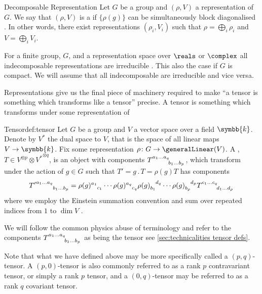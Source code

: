 \documentclass[fleqn]{NotesClass}
\renewcommand{\field}{\symbb{k}}
\newcommand{\action}{\mathbin{.}}
\newcommand{\dual}[1]{{#1^{*}}}
\begin{document}
    \begin{dfn}{Decomposable Representation}{}
        Let \(G\) be a group and \((\rho, V)\) a representation of \(G\).
        We say that \((\rho, V)\) is a  if \(\{\rho(g)\}\) can be simultaneously block diagonalised \cite{hamermesh}.
        In other words, there exist representations \((\rho_i, V_i)\) such that \(\rho = \bigoplus_i \rho_i\) and \(V = \bigoplus_i V_i\).
    \end{dfn}
    
    For a finite group, \(G\), and a representation space over \(\reals\) or \(\complex\) all indecomposable representations are irreducible \cite{hamermesh}.
    This also the case if \(G\) is compact.
    We will assume that all indecomposable are irreducible and vice versa.
    
    Representations give us the final piece of machinery required to make \enquote{a tensor is something which transforms like a tensor} precise.
    A tensor is something which transforms under some representation of 
    \begin{dfn}{Tensor}{def:tensor}
        Let \(G\) be a group and \(V\) a vector space over a field \(\field\).
        Denote by \(\dual{V}\) the dual space to \(V\), that is the space of all linear maps \(V \to \field\).
        Fix some representation \(\rho \colon G \to \generalLinear(V)\).
        A , \(T \in V^{\otimes p} \otimes \dual{V}^{\otimes q}\), is an object with components \(\tensor{T}{^{a_1\dotso a_q}_{b_1 \dotso b_p}}\), which transform under the action of \(g \in G\) such that \(T' = g \action T = \rho(g)T\) has components
        \begin{equation*}
            \tensor{{T'}}{^{a_1\dotso a_q}_{b_1 \dotso b_p}} = \tensor{\rho(g)}{^{a_1}_{c_1}} \dotsm \tensor{\rho(g)}{^{a_q}_{c_q}} \tensor{\rho(g)}{_{b_1}^{d_q}} \dotsm \tensor{\rho(g)}{_{b_p}^{d_p}} \tensor{T}{^{c_1\dotso c_q}_{d_1 \dotso d_p}}
        \end{equation*}
        where we employ the Einstein summation convention and sum over repeated indices from \(1\) to \(\dim V\) \cite[18]{cvitanovic}.
    \end{dfn}
    
    We will follow the common physics abuse of terminology and refer to the components \(\tensor{T}{^{a_1\dotso a_q}_{b_1\dotso b_p}}\) as being the tensor see \cref{sec:technicalities tensor defs}.
    
    Note that what we have defined above may be more specifically called a \((p, q)\)-tensor.
    A \((p, 0)\)-tensor is also commonly referred to as a rank \(p\) contravariant tensor, or simply a rank \(p\) tensor, and a \((0, q)\)-tensor may be referred to as a rank \(q\) covariant tensor.
    
\end{document}
